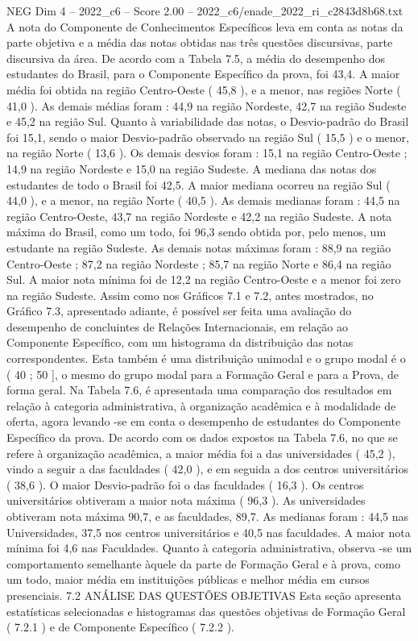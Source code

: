 \begin{textsample}{NEG Dim 4 – 2022\_c6 – Score 2.00 – 2022\_c6/enade\_2022\_ri\_c2843d8b68.txt}
A nota do Componente de Conhecimentos Específicos leva em conta as notas da parte objetiva e a média das notas obtidas nas três questões discursivas, parte discursiva da área.
De acordo com a Tabela 7.5, a média do desempenho dos estudantes do Brasil, para o Componente Específico da prova, foi 43,4.
A maior média foi obtida na região Centro-Oeste ( 45,8 ), e a menor, nas regiões Norte ( 41,0 ).
As demais médias foram : 44,9 na região Nordeste, 42,7 na região Sudeste e 45,2 na região Sul.
Quanto à variabilidade das notas, o Desvio-padrão do Brasil foi 15,1, sendo o maior Desvio-padrão observado na região Sul ( 15,5 ) e o menor, na região Norte ( 13,6 ).
Os demais desvios foram : 15,1 na região Centro-Oeste ; 14,9 na região Nordeste e 15,0 na região Sudeste.
A mediana das notas dos estudantes de todo o Brasil foi 42,5.
A maior mediana ocorreu na região Sul ( 44,0 ), e a menor, na região Norte ( 40,5 ).
As demais medianas foram : 44,5 na região Centro-Oeste, 43,7 na região Nordeste e 42,2 na região Sudeste.
A nota máxima do Brasil, como um todo, foi 96,3 sendo obtida por, pelo menos, um estudante na região Sudeste.
As demais notas máximas foram : 88,9 na região Centro-Oeste ; 87,2 na região Nordeste ; 85,7 na região Norte e 86,4 na região Sul.
A maior nota mínima foi de 12,2 na região Centro-Oeste e a menor foi zero na região Sudeste.
Assim como nos Gráficos 7.1 e 7.2, antes mostrados, no Gráfico 7.3, apresentado adiante, é possível ser feita uma avaliação do desempenho de concluintes de Relações Internacionais, em relação ao Componente Específico, com um histograma da distribuição das notas correspondentes.
Esta também é uma distribuição unimodal e o grupo modal é o ( 40 ; 50 ], o mesmo do grupo modal para a Formação Geral e para a Prova, de forma geral.
Na Tabela 7.6, é apresentada uma comparação dos resultados em relação à categoria administrativa, à organização acadêmica e à modalidade de oferta, agora levando -se em conta o desempenho de estudantes do Componente Específico da prova.
De acordo com os dados expostos na Tabela 7.6, no que se refere à organização acadêmica, a maior média foi a das universidades ( 45,2 ), vindo a seguir a das faculdades ( 42,0 ), e em seguida a dos centros universitários ( 38,6 ).
O maior Desvio-padrão foi o das faculdades ( 16,3 ).
Os centros universitários obtiveram a maior nota máxima ( 96,3 ).
As universidades obtiveram nota máxima 90,7, e as faculdades, 89,7.
As medianas foram : 44,5 nas Universidades, 37,5 nos centros universitários e 40,5 nas faculdades.
A maior nota mínima foi 4,6 nas Faculdades.
Quanto à categoria administrativa, observa -se um comportamento semelhante àquele da parte de Formação Geral e à prova, como um todo, maior média em instituições públicas e melhor média em cursos presenciais. 7.2 ANÁLISE DAS QUESTÕES OBJETIVAS Esta seção apresenta estatísticas selecionadas e histogramas das questões objetivas de Formação Geral ( 7.2.1 ) e de Componente Específico ( 7.2.2 ).

\end{textsample}
